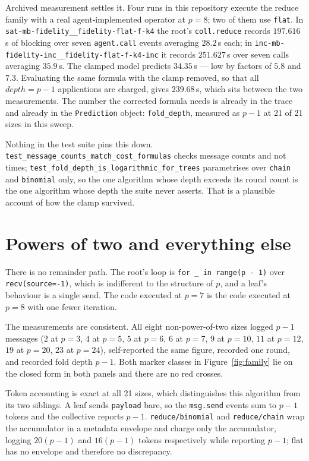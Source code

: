 \documentclass[11pt]{article}
\begin{document}
Archived measurement settles it. Four runs in this repository execute the reduce family with a
real agent-implemented operator at $p=8$; two of them use \texttt{flat}. In
\texttt{sat-mb-fidelity\_\_fidelity-flat-f-k4} the root's \texttt{coll.reduce} records
$197.616$\,s of blocking over seven \texttt{agent.call} events averaging $28.2$\,s each; in
\texttt{inc-mb-fidelity-inc\_\_fidelity-flat-f-k4-inc} it records $251.627$\,s over seven calls
averaging $35.9$\,s. The clamped model predicts $34.35$\,s --- low by factors of $5.8$ and
$7.3$. Evaluating the same formula with the clamp removed, so that all $\mathit{depth} = p-1$
applications are charged, gives $239.68$\,s, which sits between the two measurements. The
number the corrected formula needs is already in the trace and already in the
\texttt{Prediction} object: \texttt{fold\_depth}, measured as $p-1$ at 21 of 21 sizes in this
sweep.

Nothing in the test suite pins this down. \texttt{test\_message\_counts\_match\_cost\_formulas}
checks message counts and not times; \texttt{test\_fold\_depth\_is\_logarithmic\_for\_trees}
parametrises over \texttt{chain} and \texttt{binomial} only, so the one algorithm whose depth
exceeds its round count is the one algorithm whose depth the suite never asserts. That is a
plausible account of how the clamp survived.

\section{Powers of two and everything else}

There is no remainder path. The root's loop is \texttt{for \_ in range(p - 1)} over
\texttt{recv(source=-1)}, which is indifferent to the structure of $p$, and a leaf's behaviour
is a single send. The code executed at $p=7$ is the code executed at $p=8$ with one fewer
iteration.

The measurements are consistent. All eight non-power-of-two sizes logged $p-1$ messages ($2$ at
$p=3$, $4$ at $p=5$, $5$ at $p=6$, $6$ at $p=7$, $9$ at $p=10$, $11$ at $p=12$, $19$ at $p=20$,
$23$ at $p=24$), self-reported the same figure, recorded one round, and recorded fold depth
$p-1$. Both marker classes in Figure~\ref{fig:family} lie on the closed form in both panels and
there are no red crosses.

Token accounting is exact at all 21 sizes, which distinguishes this algorithm from its two
siblings. A leaf sends \texttt{payload} bare, so the \texttt{msg.send} events sum to $p-1$
tokens and the collective reports $p-1$. \texttt{reduce/binomial} and \texttt{reduce/chain}
wrap the accumulator in a metadata envelope and charge only the accumulator, logging $20(p-1)$
and $16(p-1)$ tokens respectively while reporting $p-1$; flat has no envelope and therefore no
discrepancy.
\end{document}
